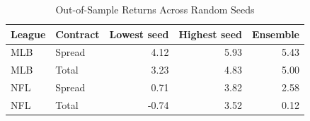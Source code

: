 \begin{table}[htbp]\centering\small
\caption{Out-of-Sample Returns Across Random Seeds}
\label{tab:seed-returns}
\begin{tabular}{@{}llrrr@{}}\toprule
League & Contract & Lowest seed & Highest seed & Ensemble\\\midrule
MLB & Spread & 4.12 & 5.93 & 5.43\\
MLB & Total & 3.23 & 4.83 & 5.00\\
NFL & Spread & 0.71 & 3.82 & 2.58\\
NFL & Total & -0.74 & 3.52 & 0.12\\
\bottomrule\end{tabular}
\end{table}
